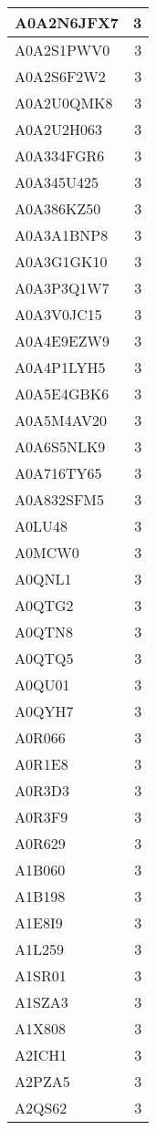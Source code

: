 \documentclass[
]{book}
\theoremstyle{definition}
\theoremstyle{definition}
\theoremstyle{definition}
\theoremstyle{definition}
\theoremstyle{remark}
\begin{document}
\begin{table}
\begin{tabular}{l|r}
\hline
A0A2N6JFX7 & 3\\
\hline
A0A2S1PWV0 & 3\\
\hline
A0A2S6F2W2 & 3\\
\hline
A0A2U0QMK8 & 3\\
\hline
A0A2U2H063 & 3\\
\hline
A0A334FGR6 & 3\\
\hline
A0A345U425 & 3\\
\hline
A0A386KZ50 & 3\\
\hline
A0A3A1BNP8 & 3\\
\hline
A0A3G1GK10 & 3\\
\hline
A0A3P3Q1W7 & 3\\
\hline
A0A3V0JC15 & 3\\
\hline
A0A4E9EZW9 & 3\\
\hline
A0A4P1LYH5 & 3\\
\hline
A0A5E4GBK6 & 3\\
\hline
A0A5M4AV20 & 3\\
\hline
A0A6S5NLK9 & 3\\
\hline
A0A716TY65 & 3\\
\hline
A0A832SFM5 & 3\\
\hline
A0LU48 & 3\\
\hline
A0MCW0 & 3\\
\hline
A0QNL1 & 3\\
\hline
A0QTG2 & 3\\
\hline
A0QTN8 & 3\\
\hline
A0QTQ5 & 3\\
\hline
A0QU01 & 3\\
\hline
A0QYH7 & 3\\
\hline
A0R066 & 3\\
\hline
A0R1E8 & 3\\
\hline
A0R3D3 & 3\\
\hline
A0R3F9 & 3\\
\hline
A0R629 & 3\\
\hline
A1B060 & 3\\
\hline
A1B198 & 3\\
\hline
A1E8I9 & 3\\
\hline
A1L259 & 3\\
\hline
A1SR01 & 3\\
\hline
A1SZA3 & 3\\
\hline
A1X808 & 3\\
\hline
A2ICH1 & 3\\
\hline
A2PZA5 & 3\\
\hline
A2QS62 & 3\\
\hline

\end{tabular}
\end{table}
\end{document}
